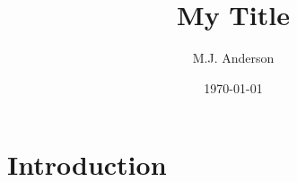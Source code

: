 \documentclass{article}
\title{My Title}
\author{M.J. Anderson}
\date{\today}
\begin{document}
\maketitle

\section{Introduction}
\end{document}
